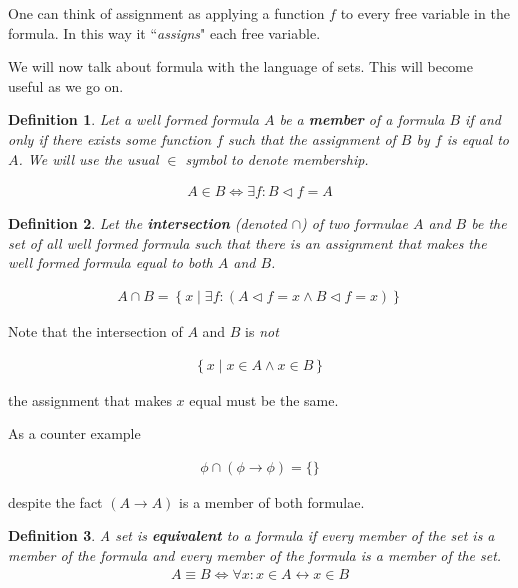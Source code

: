 \documentclass{article}
\newtheorem{defin}{Definition}
\begin{document}
One can think of assignment as applying a function $f$ to every free variable in the formula.
In this way it ``\textit{assigns}" each free variable.

We will now talk about formula with the language of sets.
This will become useful as we go on.

\begin{defin}
Let a well formed formula $A$ be a \textbf{member} of a formula $B$
if and only if there exists some function $f$ such that the assignment of $B$ by $f$ is equal to $A$.
We will use the usual $\in$ symbol to denote membership.

\begin{align*}
A \in B \iff \exists f: B \lhd f = A
\end{align*}
\end{defin}

\begin{defin}
Let the \textbf{intersection} (denoted $\cap$) of two formulae $A$ and $B$ be the set of all well formed formula such that there is an assignment that makes the well formed formula equal to both $A$ and $B$.

\begin{align*}
A \cap B = \left\{x \mid \exists f: (A \lhd f = x \land B \lhd f = x)\right\}
\end{align*}
\end{defin}

Note that the intersection of $A$ and $B$ is \textit{not}

\begin{align*}
\left\{x \mid x \in A \land x \in B\right\}
\end{align*}

the assignment that makes $x$ equal must be the same.

As a counter example

\begin{align*}
\phi \cap (\phi \rightarrow \phi) = \{\}
\end{align*}

despite the fact $(A \rightarrow A)$ is a member of both formulae.

\begin{defin}
A set is \textbf{equivalent} to a formula if every member of the set is a member of the formula and every member of the formula is a member of the set.
\begin{align*}
A \equiv B \iff \forall x: x \in A \leftrightarrow x \in B
\end{align*}
\end{defin}
\end{document}
